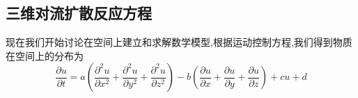 \subsection{三维对流扩散反应方程}
现在我们开始讨论在空间上建立和求解数学模型,根据运动控制方程,我们得到物质在空间上的分布为
\begin{equation}
 \dfrac{\partial u}{\partial t}=a\left(\dfrac{\partial^2 u}{\partial x^2}+\dfrac{\partial^2 u}{\partial y^2}
 +\dfrac{\partial^2 u}{\partial z^2}\right)-b\left(\dfrac{\partial u}{\partial x}+\dfrac{\partial u}{\partial y}
 +\dfrac{\partial u}{\partial z}\right)+cu+d
\end{equation}
